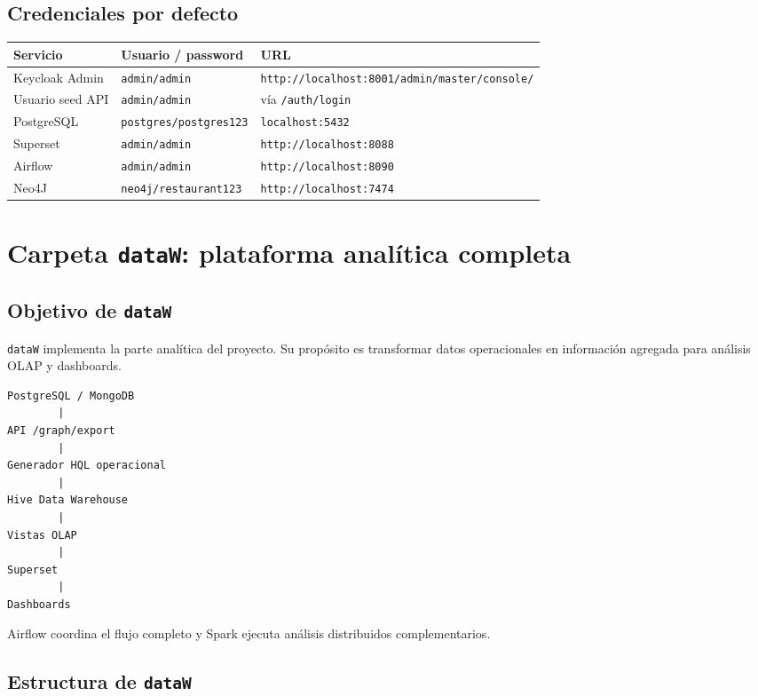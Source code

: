 \documentclass[12pt,letterpaper]{article}
\def\codefile#1{\nolinkurl{#1}}
\begin{document}
\subsection{Credenciales por defecto}

\begin{longtable}{p{}p{}p{}}
\toprule
\textbf{Servicio} & \textbf{Usuario / password} & \textbf{URL}\\
\midrule
Keycloak Admin & \codefile{admin/admin} & \codefile{http://localhost:8001/admin/master/console/}\\
Usuario seed API & \codefile{admin/admin} & vía \codefile{/auth/login}\\
PostgreSQL & \codefile{postgres/postgres123} & \codefile{localhost:5432}\\
Superset & \codefile{admin/admin} & \codefile{http://localhost:8088}\\
Airflow & \codefile{admin/admin} & \codefile{http://localhost:8090}\\
Neo4J & \codefile{neo4j/restaurant123} & \codefile{http://localhost:7474}\\
\bottomrule
\end{longtable}

\section{Carpeta \codefile{dataW}: plataforma analítica completa}

\subsection{Objetivo de \codefile{dataW}}

\codefile{dataW} implementa la parte analítica del proyecto. Su propósito es transformar datos operacionales en información agregada para análisis OLAP y dashboards.

\begin{lstlisting}
PostgreSQL / MongoDB
        |
API /graph/export
        |
Generador HQL operacional
        |
Hive Data Warehouse
        |
Vistas OLAP
        |
Superset
        |
Dashboards
\end{lstlisting}

Airflow coordina el flujo completo y Spark ejecuta análisis distribuidos complementarios.

\subsection{Estructura de \codefile{dataW}}
\end{document}
